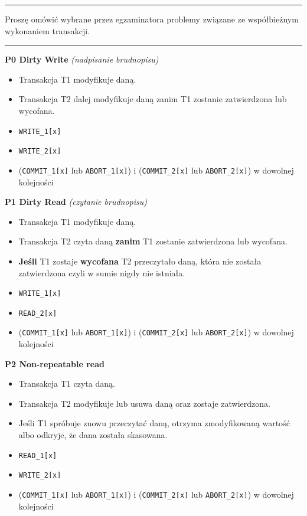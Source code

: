 \documentclass[a5paper,6pt]{article}
\newcommand{\horrule}[1]{\rule{\linewidth}{#1}}
\begin{document}
\pagebreak

    \horrule{0.5pt}
    Proszę omówić wybrane przez egzaminatora problemy związane ze współbieżnym
    wykonaniem transakcji.\\
    \horrule{0.5pt}

    \textbf{P0 Dirty Write} \textit{(nadpisanie brudnopisu)}
    \begin{itemize}
        \item Transakcja T1 modyfikuje daną.
        \item Transakcja T2 dalej modyfikuje daną zanim T1 zostanie zatwierdzona
              lub wycofana.
        \item \texttt{WRITE\_1[x]}
        \item \texttt{WRITE\_2[x]}
        \item (\texttt{COMMIT\_1[x]} lub \texttt{ABORT\_1[x]}) i
              (\texttt{COMMIT\_2[x]} lub \texttt{ABORT\_2[x]})
              w dowolnej kolejności
    \end{itemize}

    \textbf{P1 Dirty Read} \textit{(czytanie brudnopisu)}
    \begin{itemize}
        \item Transakcja T1 modyfikuje daną.
        \item Transakcja T2 czyta daną \textbf{zanim} T1 zostanie zatwierdzona
              lub wycofana.
        \item \textbf{Jeśli} T1 zostaje \textbf{wycofana} T2 przeczytało daną,
              która nie została zatwierdzona czyli w sumie nigdy nie istniała.
        \item \texttt{WRITE\_1[x]}
        \item \texttt{READ\_2[x]}
        \item (\texttt{COMMIT\_1[x]} lub \texttt{ABORT\_1[x]}) i
              (\texttt{COMMIT\_2[x]} lub \texttt{ABORT\_2[x]})
              w dowolnej kolejności
    \end{itemize}

    \textbf{P2 Non-repeatable read}
    \begin{itemize}
        \item Transakcja T1 czyta daną.
        \item Transakcja T2 modyfikuje lub usuwa daną oraz zostaje zatwierdzona.
        \item Jeśli T1 spróbuje znowu przeczytać daną, otrzyma zmodyfikowaną
              wartość albo odkryje, że dana została skasowana.
        \item \texttt{READ\_1[x]}
        \item \texttt{WRITE\_2[x]}
        \item (\texttt{COMMIT\_1[x]} lub \texttt{ABORT\_1[x]}) i
              (\texttt{COMMIT\_2[x]} lub \texttt{ABORT\_2[x]})
              w dowolnej kolejności
    \end{itemize}
\end{document}
